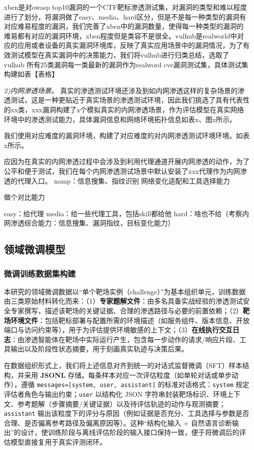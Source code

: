 \documentclass[a4paper, twocolumn]{article}
\begin{document}
xben是对owasp top10漏洞的一个CTF靶标渗透测试集，对漏洞的类型和难以程度进行了划分，将漏洞做了easy、media、hard区分，但是不是每一种类型的漏洞有对应难易程度的漏洞，我们完善了xben中的漏洞数量，使得每一种类型的漏洞的难易都有对应的漏洞环境，xben程度但是类容不是很全。vulhub是realworld中对应的应用或者设备的真实漏洞环境库，反映了真实应用场景中的漏洞情况，为了有效测试模型在真实漏洞中的决策能力，我们将vulhub进行归类总结，选取了vulhub 所有25类漏洞每一类最新的漏洞作为realword cve漏洞测试集，具体测试集构建如表【表格】

\textit{2)内网渗透场景。}
真实的渗透测试环境还涉及到如内网渗透这样的复杂场景的渗透测试，这是一种更贴近于真实场景的渗透测试环境，因此我们挑选了具有代表性的xx类，xxx漏洞构建了x个模拟真实的内网渗透场景，作为评估模型在真实网络环境中的渗透测试能力，具体漏洞信息和网络环境拓扑信息如表x、图x所示。

我们使用对应难度的漏洞环境，构建了对应难度的对内网渗透测试环境环境。如表x所示。

应因为在真实的内网渗透过程中会涉及到利用代理通道开展内网渗透的动作，为了公平和便于测试，我们在每个内网渗透测试场景中默认安装了xxx代理作为内网渗透的代理入口。
	namp：信息搜集、指纹识别
	网络变化适配和工具选择能力

	做个对比能力

	easy：给代理
	media：给一些代理工具，包括skill都给他
	hard：啥也不给（考察内网渗透综合能力：信息搜集、漏洞指纹，目标变化能力）

\subsection{领域微调模型}
\subsubsection{微调训练数据集构建}

本研究的领域微调数据以“单个靶场实例（challenge）”为基本组织单元，训练数据由三类原始材料转化而来：（1）\textbf{专家题解文件}：由多名具备实战经验的渗透测试安全专家撰写，描述该靶场的关键证据、合理的渗透路径与必要的前置依赖；（2）\textbf{靶场环境文件}：包括靶标部署与配置所需的环境描述（如服务组件、版本信息、开放端口与访问约束等），用于为评估提供环境敏感的上下文；（3）\textbf{在线执行交互日志}：由渗透智能体在靶场中实际运行产生，包含每一步动作的请求/响应片段、工具输出以及阶段性状态摘要，用于刻画真实轨迹与决策后果。

在数据组织形式上，我们将上述信息对齐到统一的对话式监督微调（SFT）样本结构，并采用 \textbf{JSONL} 存储。每条样本对应一次评估粒度（如单轮对话或单步动作），遵循 \texttt{messages=[system,\ user,\ assistant]} 的标准对话格式：\texttt{system} 规定评估者角色与输出约束；\texttt{user} 以结构化 JSON 字符串封装靶场标识、环境上下文、参考题解（步骤摘要/关键证据）以及待评估轨迹的动作与观测摘要；\texttt{assistant} 输出该粒度下的评分与原因（例如证据是否充分、工具选择与参数是否合理、是否偏离参考路径及偏离原因等）。这种“结构化输入 + 自然语言诊断输出”的设计，使训练阶段与离线评估阶段的输入接口保持一致，便于将微调后的评估模型直接复用于真实评测闭环。
\end{document}
